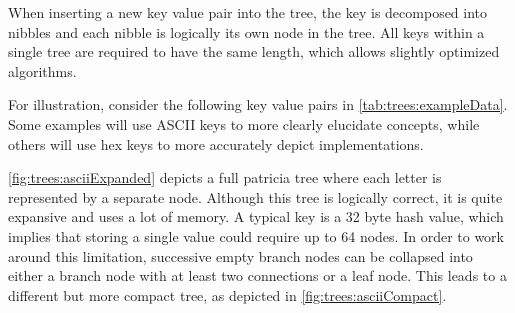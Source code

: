 When inserting a new key value pair into the tree, the key is decomposed into nibbles and each nibble is logically its own node in the tree.
All keys within a single tree are required to have the same length, which allows slightly optimized algorithms.

For illustration, consider the following key value pairs in \autoref{tab:trees:exampleData}.
Some examples will use ASCII keys to more clearly elucidate concepts, while others will use hex keys to more accurately depict \codenamespace implementations.

\autoref{fig:trees:asciiExpanded} depicts a full patricia tree where each letter is represented by a separate node.
Although this tree is logically correct, it is quite expansive and uses a lot of memory.
A typical key is a 32 byte hash value, which implies that storing a single value could require up to 64 nodes.
In order to work around this limitation, successive empty branch nodes can be collapsed into either a branch node with at least two connections or a leaf node.
This leads to a different but more compact tree, as depicted in \autoref{fig:trees:asciiCompact}.

\begin{table}[ht]
\end{table}

\begin{figure}[H]
\end{figure}

